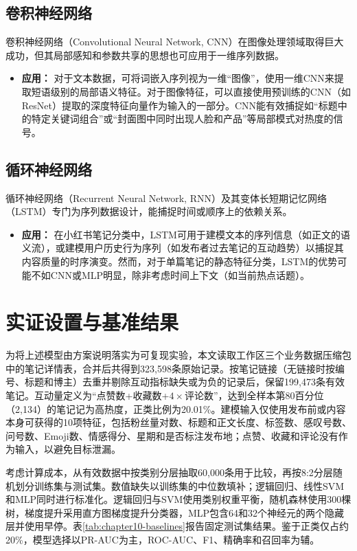 \subsection{卷积神经网络}
卷积神经网络（Convolutional Neural Network, CNN）在图像处理领域取得巨大成功，但其局部感知和参数共享的思想也可应用于一维序列数据。
\begin{itemize}
	\item \textbf{应用：} 对于文本数据，可将词嵌入序列视为一维“图像”，使用一维CNN来提取短语级别的局部语义特征。对于图像特征，可以直接使用预训练的CNN（如ResNet）提取的深度特征向量作为输入的一部分。CNN能有效捕捉如“标题中的特定关键词组合”或“封面图中同时出现人脸和产品”等局部模式对热度的信号。
\end{itemize}

\subsection{循环神经网络}
循环神经网络（Recurrent Neural Network, RNN）及其变体长短期记忆网络（LSTM）专门为序列数据设计，能捕捉时间或顺序上的依赖关系。
\begin{itemize}
	\item \textbf{应用：} 在小红书笔记分类中，LSTM可用于建模文本的序列信息（如正文的语义流），或建模用户历史行为序列（如发布者过去笔记的互动趋势）以捕捉其内容质量的时序演变。然而，对于单篇笔记的静态特征分类，LSTM的优势可能不如CNN或MLP明显，除非考虑时间上下文（如当前热点话题）。
\end{itemize}

\section{实证设置与基准结果}
为将上述模型由方案说明落实为可复现实验，本文读取工作区三个业务数据压缩包中的笔记详情表，合并后共得到323,598条原始记录。按笔记链接（无链接时按编号、标题和博主）去重并剔除互动指标缺失或为负的记录后，保留199,473条有效笔记。互动量定义为“点赞数+收藏数+$4\times$评论数”，达到全样本第80百分位（2,134）的笔记记为高热度，正类比例为20.01\%。建模输入仅使用发布前或内容本身可获得的10项特征，包括粉丝量对数、标题和正文长度、标签数、感叹号数、问号数、Emoji数、情感得分、星期和是否标注发布地；点赞、收藏和评论没有作为输入，以避免目标泄漏。

考虑计算成本，从有效数据中按类别分层抽取60,000条用于比较，再按8:2分层随机划分训练集与测试集。数值缺失以训练集的中位数填补；逻辑回归、线性SVM和MLP同时进行标准化。逻辑回归与SVM使用类别权重平衡，随机森林使用300棵树，梯度提升采用直方图梯度提升分类器，MLP包含64和32个神经元的两个隐藏层并使用早停。表\ref{tab:chapter10-baselines}报告固定测试集结果。鉴于正类仅占约20\%，模型选择以PR-AUC为主，ROC-AUC、F1、精确率和召回率为辅。

